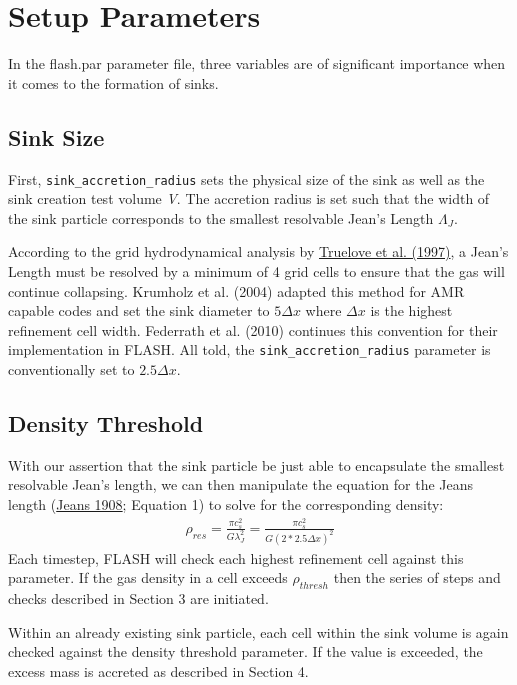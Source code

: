 \documentclass[10pt]{article}
\begin{document}
\section{Setup Parameters}
In the flash.par parameter file, three variables are of significant importance when it comes to the formation of sinks.
\subsection{Sink Size}

First,  \texttt{sink\_accretion\_radius} sets the physical size of the sink as well as the sink creation test volume \emph{V}. The accretion radius is set such that the width of the sink particle corresponds to the smallest resolvable Jean's Length $\Lambda_{J}$.

According to the grid hydrodynamical analysis by \href{https://ui.adsabs.harvard.edu/abs/1997ApJ...489L.179T/abstract}{Truelove et al. (1997)}, a Jean's Length must be resolved by a minimum of 4 grid cells to ensure that the gas will continue collapsing.  Krumholz et al. (2004) adapted this method for AMR capable codes and set the sink diameter to $5\Delta x$ where $\Delta x$ is the highest refinement cell width. Federrath et al. (2010) continues this convention for their implementation in FLASH. All told, the \texttt{sink\_accretion\_radius} parameter is conventionally set to $2.5\Delta x$.

\subsection{Density Threshold}
With our assertion that the sink particle be just able to encapsulate the smallest resolvable Jean's length, we can then manipulate the equation for the Jeans length (\href{https://ui.adsabs.harvard.edu/abs/1902RSPTA.199....1J/abstract}{Jeans 1908}; Equation 1) to solve for the corresponding density:
\begin{align}
\rho_{res} = \frac{\pi c_{s}^2}{G\lambda_{J}^2} = \frac{\pi c_{s}^2}{G(2*2.5\Delta x)^2}
\end{align}
Each timestep, FLASH will check each highest refinement cell against this parameter. If the gas density in a cell exceeds $\rho_{thresh}$ then the series of steps and checks described in Section 3 are initiated.

Within an already existing sink particle, each cell within the sink volume is again checked against the density threshold parameter. If the value is exceeded, the excess mass is accreted as described in Section 4.
\end{document}
